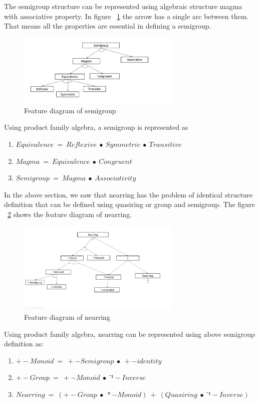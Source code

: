 The semigroup structure can be represented using algebraic structure magma with
associative property. In figure ~\ref{fig_multienv_1} the arrow has a single
arc between them. That means all the properties are essential in defining a
semigroup.
\begin{figure}[ht]
	\centering
	\includegraphics[width=0.7\textwidth]{figures/Sample/semigroupPFA.jpg}
	\caption{Feature diagram of semigroup}
	\label{fig_multienv_1}
\end{figure}
Using product family algebra, a semigroup is represented as 
\begin{enumerate}
\item $Equivalence\ =\ Reflexive\ ∙\ Symmetric\ ∙\ Transitive$
\item $Magma\ =\ Equivalence\ ∙\ Congruent$
\item $Semigroup\ =\ Magma\ ∙\ Associativity$ 
\end{enumerate}
In the above section, we saw that nearring has the problem of identical
structure definition that can be defined using quasiring or group and semigroup.
The figure ~\ref{fig_nearring} shows the feature diagram of nearring. 
 \begin{figure}[ht]
	\centering		
	\includegraphics[width=0.7\textwidth]{figures/Sample/nearringPFA.jpg}
	\caption{Feature diagram of nearring}
	\label{fig_nearring}
\end{figure}

Using product family algebra, nearring can be represented using above semigroup definition as:
\begin{enumerate}
\item $ +-Monoid\ =\ +-Semigroup\ ∙\ +-identity$
\item  $ +-Group\ =\ +-Monoid\ ∙\ ⁻¹-Inverse$
\item  $Nearring\ =\ (+-Group\ ∙\ *-Monoid)\ +\ (Quasiring\ ∙\ ⁻¹-Inverse)$
\end{enumerate}

